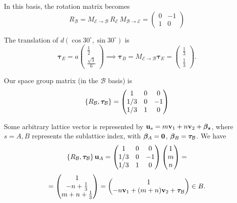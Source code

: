 In this basis, the rotation matrix becomes
$$
R_{\mathcal{B}} =  M_{\mathcal{E} \to \mathcal{B}} \, R_{\mathcal{E}} \, M_{\mathcal{B}\to\mathcal{E}} =
\begin{pmatrix}
0 & -1 \\
1 &  0
\end{pmatrix}
$$

The translation of $d(\cos 30^\circ, \sin 30^\circ)$ is
$$
\bm{\tau}_E = a \begin{pmatrix} \frac{1}{2} \\ \frac{\sqrt{3}}{6} \end{pmatrix} \implies
\bm{\tau}_B = M_{\mathcal{E} \to \mathcal{B}} \bm{\tau}_E =
\begin{pmatrix}
\frac{1}{3} \\ \frac{1}{3}
\end{pmatrix}.
$$

Our space group matrix (in the $\mathcal{B}$ basis) is
$$
\{R_{\mathcal{B}}, {\bm{\tau}}_{\mathcal{B}}\} =
\begin{pmatrix}
1 & 0 & 0 \\
1/3 & 0 & -1 \\
1/3 & 1 & 0 \\
\end{pmatrix}
$$

Some arbitrary lattice vector is represented by ${\vb{u}}_s = m {\vb{v}}_1 + n{\vb{v}}_2 + \bm{\beta_s}$, where $s = A, B$ represents the sublattice index, with $\bm{\beta}_A = {\vb{0}}$, $\bm{\beta}_B = {\bm{\tau}}_{\mathcal{B}}$. We have
$$
\{R_{\mathcal{B}}, {\bm{\tau}}_{\mathcal{B}}\} \, {\vb{u}}_A =
\begin{pmatrix}
1 & 0 & 0 \\
1/3 & 0 & -1 \\
1/3 & 1 & 0 \\
\end{pmatrix}
\begin{pmatrix}
1 \\ m \\ n
\end{pmatrix}
=
$$
$$
=
\begin{pmatrix}
1 \\ -n + \frac{1}{3} \\ m+n+\frac{1}{3}
\end{pmatrix}
=
\begin{pmatrix}
1 \\ -n {\vb{v}}_1 + (m+n) {\vb{v}}_2 + {\bm{\tau}}_{\mathcal{B}}
\end{pmatrix}
\in B.
$$

